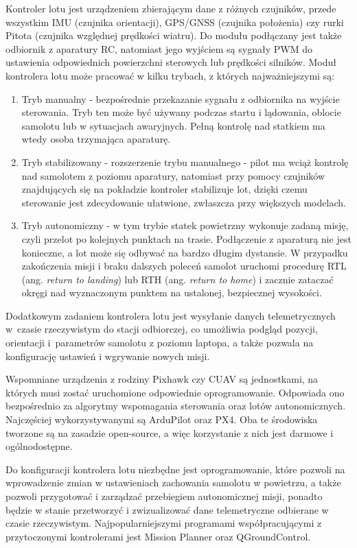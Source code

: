 \documentclass[12pt, a4paper]{article}
\begin{document}
Kontroler lotu jest urządzeniem zbierającym dane z różnych czujników, przede wszystkim IMU (czujnika orientacji), GPS/GNSS (czujnika położenia) czy rurki Pitota (czujnika względnej prędkości wiatru). Do modułu podłączany jest także odbiornik z aparatury RC, natomiast jego wyjściem są sygnały PWM do ustawienia odpowiednich powierzchni sterowych lub prędkości silników. 
Moduł kontrolera lotu może pracować w kilku trybach, z których najważniejszymi są:
\begin{enumerate}

	\item Tryb manualny - bezpośrednie przekazanie sygnału z odbiornika na wyjście sterowania. Tryb ten może być używany podczas startu i lądowania, oblocie samolotu lub w sytuacjach awaryjnych. Pełną kontrolę nad statkiem ma wtedy osoba trzymająca aparaturę.
	\item Tryb stabilizowany - rozszerzenie trybu manualnego - pilot ma wciąż kontrolę nad samolotem z poziomu aparatury, natomiast przy pomocy czujników znajdujących się na pokładzie kontroler stabilizuje lot, dzięki czemu sterowanie jest zdecydowanie ułatwione, zwłaszcza przy większych modelach.
	\item Tryb autonomiczny - w tym trybie statek powietrzny wykonuje zadaną misję, czyli przelot po kolejnych punktach na trasie. Podłączenie z aparaturą nie jest konieczne, a lot może się odbywać na bardzo długim dystansie. W przypadku zakończenia misji i braku dalszych poleceń samolot uruchomi procedurę RTL (ang. \textit{return to landing}) lub RTH (ang. \textit{return to home}) i zacznie zataczać okręgi nad wyznaczonym punktem na ustalonej, bezpiecznej wysokości.

\end{enumerate}
	
Dodatkowym zadaniem kontrolera lotu jest wysyłanie danych telemetrycznych w~czasie rzeczywistym do stacji odbiorczej, co umożliwia podgląd pozycji, orientacji i~parametrów samolotu z poziomu laptopa, a także pozwala na konfigurację ustawień i wgrywanie nowych misji.

Wspomniane urządzenia z rodziny Pixhawk czy CUAV są jednostkami, na których musi zostać uruchomione odpowiednie oprogramowanie. Odpowiada ono bezpośrednio za algorytmy wspomagania sterowania oraz lotów autonomicznych. Najczęściej wykorzystywanymi są ArduPilot oraz PX4. Oba te środowiska tworzone są na zasadzie open-source, a więc korzystanie z nich jest darmowe i ogólnodostępne. 

Do konfiguracji kontrolera lotu niezbędne jest oprogramowanie, które pozwoli na wprowadzenie zmian w ustawieniach zachowania samolotu w powietrzu, a także pozwoli przygotować i zarządzać przebiegiem autonomicznej misji, ponadto będzie w stanie przetworzyć i zwizualizować dane telemetryczne odbierane w czasie rzeczywistym. Najpopularniejszymi programami współpracującymi z przytoczonymi kontrolerami jest Mission Planner oraz QGroundControl.
\end{document}
